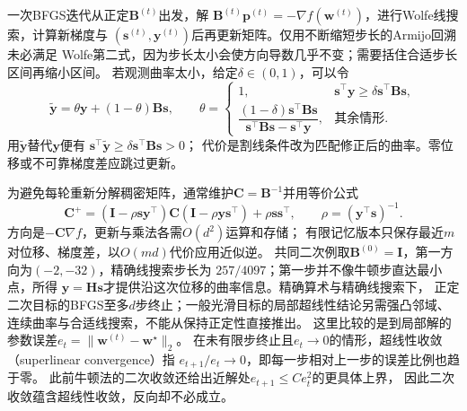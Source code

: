 一次BFGS迭代从正定$\bm B^{(t)}$出发，解
$\bm B^{(t)}\bm p^{(t)}=-\nabla f(\bm w^{(t)})$，进行Wolfe线搜索，计算新梯度与
$(\bm s^{(t)},\bm y^{(t)})$后再更新矩阵。仅用不断缩短步长的Armijo回溯未必满足
Wolfe第二式，因为步长太小会使方向导数几乎不变；需要括住合适步长区间再缩小区间。
若观测曲率太小，给定$\delta\in(0,1)$，可以令
\[
 \widetilde{\bm y}=\theta\bm y+(1-\theta)\bm B\bm s,\qquad
 \theta=
 \begin{cases}
 1,&\bm s^\top\bm y\geq\delta\bm s^\top\bm B\bm s,\\
 \dfrac{(1-\delta)\bm s^\top\bm B\bm s}
 {\bm s^\top\bm B\bm s-\bm s^\top\bm y},&\text{其余情形}.
 \end{cases}
\]
用$\widetilde{\bm y}$替代$\bm y$便有
$\bm s^\top\widetilde{\bm y}\geq\delta\bm s^\top\bm B\bm s>0$；
代价是割线条件改为匹配修正后的曲率。零位移或不可靠梯度差应跳过更新。

为避免每轮重新分解稠密矩阵，通常维护$\bm C=\bm B^{-1}$并用等价公式
\[
 \bm C^+=(\bm I-\rho\bm s\bm y^\top)\bm C
          (\bm I-\rho\bm y\bm s^\top)+\rho\bm s\bm s^\top,
 \qquad \rho=(\bm y^\top\bm s)^{-1}.
\]
方向是$-\bm C\nabla f$，更新与乘法各需$O(d^2)$运算和存储；
有限记忆版本只保存最近$m$对位移、梯度差，以$O(md)$代价应用近似逆。
共同二次例取$\bm B^{(0)}=\bm I$，第一方向为$(-2,-32)$，精确线搜索步长为
$257/4097$；第一步并不像牛顿步直达最小点，所得
$\bm y=\bm H\bm s$才提供沿这次位移的曲率信息。精确算术与精确线搜索下，
正定二次目标的BFGS至多$d$步终止；一般光滑目标的局部超线性结论另需强凸邻域、
连续曲率与合适线搜索，不能从保持正定性直接推出。
这里比较的是到局部解的参数误差$e_t=\|\bm w^{(t)}-\bm w^\star\|_2$。
在未有限步终止且$e_t\to0$的情形，超线性收敛（superlinear convergence）指
$e_{t+1}/e_t\to0$，即每一步相对上一步的误差比例也趋于零。
此前牛顿法的二次收敛还给出近解处$e_{t+1}\leq Ce_t^2$的更具体上界，
因此二次收敛蕴含超线性收敛，反向却不必成立。

